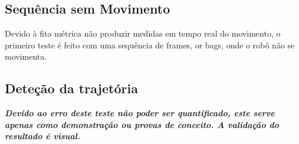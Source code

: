 \subsection{Sequência sem Movimento}

Devido à fita métrica não produzir medidas em tempo real do movimento, o primeiro teste é feito com uma sequência de frames, or bags, onde o robô não se movimenta.

\subsection{Deteção da trajetória}

\textit{\textbf{
Devido ao erro deste teste não poder ser quantificado, este serve apenas como demonstração ou provas de conceito. A validação do resultado é visual.}}

